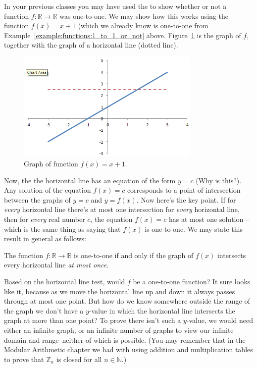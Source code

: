 \begin{rem}\label{rem:onetoone}
In your previous classes you may have used the   to show whether or not a function $f: \mathbb{R} \rightarrow \mathbb{R}$ was one-to-one.  We may show how this works using the function $f(x)=x +1$ (which we already know is one-to-one from Example~\ref{example:functions:1_to_1_or_not} above.  Figure~\ref{fig:xplus1} is the graph of $f$, together with the graph of a  horizontal line (dotted line).
\begin{figure}[h]
\includegraphics[width=3.5in]{images/xplus1.png}
\caption{Graph of function $f(x)=x +1$.}
\label{fig:xplus1}
\end{figure}

Now, the  the horizontal line has an equation of the form $y=c$ (Why is this?). Any solution of the equation $f(x)=c$ corresponds to a point of intersection between the graphs of $y=c$ and $y=f(x)$. Now here's the key point.  If for \emph{every} horizontal line there's at most one intersection for \emph{every} horizontal line, then  for \emph{every} real number $c$, the equation $f(x)=c$ has at most one solution --which is the same thing as saying that $f(x)$ is one-to-one. We may state this result in general as follows:
\bigskip

\noindent 
The function $f:\mathbb{R} \rightarrow \mathbb{R}$ is one-to-one if and only if the graph of $f(x)$ intersects every horizontal line \emph{at most once}.
\bigskip

Based on the horizontal line test, would $f$ be a one-to-one function?  It sure looks like it, because as we move the horizontal line up and down it always passes through at most one point.  But how do we know somewhere outside the range of the graph we don't have a $y$-value in which the horizontal line intersects the graph at more than one point?  To prove there isn't such a $y$-value, we would need either an infinite graph, or an infinite number of graphs to view our infinite domain and range--neither of which is possible.  (You may remember that in the Modular Arithmetic chapter we had with using addition and multiplication tables to prove that ${\mathbb Z}_n$ is closed for all $n \in {\mathbb N}$.)   


\end{rem}
